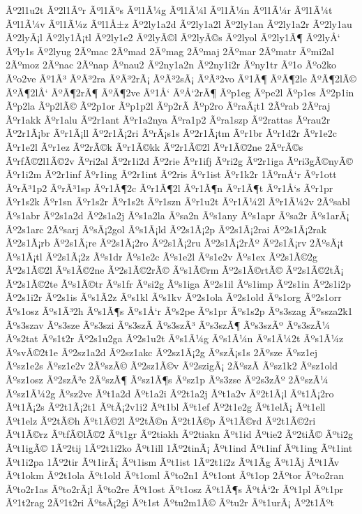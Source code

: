 {Ãº2l1u2t
Ãº2l1Ãºr
Ãºl1Ãºs
Ãºl1Ã¼g
Ãºl1Ã¼l
Ãºl1Ã¼n
Ãºl1Ã¼r
Ãºl1Ã¼t
Ãºl1Ã¼v
Ãºl1Ã¼z
Ãºl1Å±z
Ãº2ly1a2d
Ãº2ly1a2l
Ãº2ly1an
Ãº2ly1a2r
Ãº2ly1au
Ãº2lyÃ¡l
Ãº2ly1Ã¡tl
Ãº2ly1e2
Ãº2lyÃ©l
Ãº2lyÃ©s
Ãº2lyol
Ãº2ly1Ã¶
Ãº2lyÅ‘
Ãºly1s
Ãº2lyug
2Ãºmac
2Ãºmad
2Ãºmag
2Ãºmaj
2Ãºmar
2Ãºmatr
Ãºmi2al
2Ãºmoz
2Ãºnac
2Ãºnap
Ãºnau2
Ãº2ny1a2n
Ãº2ny1i2r
Ãºny1tr
Ãº1o
Ãºo2ko
Ãºo2ve
Ãº1Ã³
ÃºÃ³2ra
ÃºÃ³2rÃ¡
ÃºÃ³2sÃ¡
ÃºÃ³2vo
Ãº1Ã¶
ÃºÃ¶2le
ÃºÃ¶2lÃ©
ÃºÃ¶2lÅ‘
ÃºÃ¶2rÃ¶
ÃºÃ¶2ve
Ãº1Å‘
ÃºÅ‘2rÃ¶
Ãºp1eg
Ãºpe2l
Ãºp1es
Ãº2p1in
Ãºp2la
Ãºp2lÃ©
Ãº2p1or
Ãºp1p2l
Ãºp2rÃ­
Ãºp2ro
ÃºraÃ¡t1
2Ãºrab
2Ãºraj
Ãºr1akk
Ãºr1alu
Ãº2r1ant
Ãºr1a2nya
Ãºra1p2
Ãºra1szp
Ãº2rattas
Ãºrau2r
Ãº2r1Ã¡br
Ãºr1Ã¡ll
Ãº2r1Ã¡2ri
ÃºrÃ¡s1s
Ãº2r1Ã¡tm
Ãºr1br
Ãºr1d2r
Ãºr1e2c
Ãºr1e2l
Ãºr1ez
Ãº2rÃ©k
Ãºr1Ã©kk
Ãº2r1Ã©2l
Ãºr1Ã©2ne
2ÃºrÃ©s
ÃºrfÃ©2l1Ã©2v
Ãºri2al
Ãº2r1i2d
Ãº2rie
Ãºr1ifj
Ãºri2g
Ãº2r1iga
Ãºri3gÃ©nyÃ©
Ãºr1i2m
Ãº2r1inf
Ãºr1ing
Ãº2r1int
Ãº2ris
Ãºr1ist
Ãºr1k2r
1ÃºrnÅ‘r
Ãºr1ott
ÃºrÃ³1p2
ÃºrÃ³1sp
Ãºr1Ã¶2c
Ãºr1Ã¶2l
Ãºr1Ã¶n
Ãºr1Ã¶t
Ãºr1Å‘s
Ãºr1pr
Ãºr1s2k
Ãºr1sn
Ãºr1s2r
Ãºr1s2t
Ãºr1szn
Ãºr1u2t
Ãºr1Ã¼2l
Ãºr1Ã¼2v
2Ãºsabl
Ãºs1abr
Ãº2s1a2d
Ãº2s1a2j
Ãºs1a2la
Ãºsa2n
Ãºs1any
Ãºs1apr
Ãºsa2r
Ãºs1arÃ¡
Ãº2s1arc
2Ãºsarj
ÃºsÃ¡2gol
Ãºs1Ã¡ld
Ãº2s1Ã¡2p
Ãº2s1Ã¡2rai
Ãº2s1Ã¡2rak
Ãº2s1Ã¡rb
Ãº2s1Ã¡re
Ãº2s1Ã¡2ro
Ãº2s1Ã¡2ru
Ãº2s1Ã¡2rÃº
Ãº2s1Ã¡rv
2ÃºsÃ¡t
Ãºs1Ã¡tl
Ãº2s1Ã¡2z
Ãºs1dr
Ãºs1e2c
Ãºs1e2l
Ãºs1e2v
Ãºs1ex
Ãº2s1Ã©2g
Ãº2s1Ã©2l
Ãºs1Ã©2ne
Ãº2s1Ã©2rÃ©
Ãºs1Ã©rm
Ãº2s1Ã©rtÃ©
Ãº2s1Ã©2tÃ¡
Ãº2s1Ã©2te
Ãºs1Ã©tr
Ãºs1fr
Ãºsi2g
Ãºs1iga
Ãº2s1il
Ãºs1imp
Ãº2s1in
Ãº2s1i2p
Ãº2s1i2r
Ãº2s1is
Ãºs1Ã­2z
Ãºs1kl
Ãºs1kv
Ãº2s1ola
Ãº2s1old
Ãºs1org
Ãº2s1orr
Ãºs1osz
Ãºs1Ã³2h
Ãºs1Ã¶s
Ãºs1Å‘r
Ãºs2pe
Ãºs1pr
Ãºs1s2p
Ãºs3szag
Ãºssza2k1
Ãºs3szav
Ãºs3sze
Ãºs3szi
Ãºs3szÃ­
Ãºs3szÃ³
Ãºs3szÃ¶
Ãºs3szÃº
Ãºs3szÃ¼
Ãºs2tat
Ãºs1t2r
Ãº2s1u2ga
Ãº2s1u2t
Ãºs1Ã¼g
Ãºs1Ã¼n
Ãºs1Ã¼2t
Ãºs1Ã¼z
ÃºsvÃ©2t1e
Ãº2sz1a2d
Ãº2sz1akc
Ãº2sz1Ã¡2g
ÃºszÃ¡s1s
2Ãºsze
Ãºsz1ej
Ãºsz1e2s
Ãºsz1e2v
2ÃºszÃ©
Ãº2sz1Ã©v
Ãº2szigÃ¡
2ÃºszÃ­
Ãºsz1k2
Ãºsz1old
Ãºsz1osz
Ãº2szÃ³e
2ÃºszÃ¶
Ãºsz1Ã¶s
Ãºsz1p
Ãºs3zse
Ãº2s3zÃº
2ÃºszÃ¼
Ãºsz1Ã¼2g
Ãºsz2ve
Ãºt1a2d
Ãºt1a2i
Ãº2t1a2j
Ãºt1a2v
Ãº2t1Ã¡l
Ãºt1Ã¡2ro
Ãºt1Ã¡2s
Ãº2t1Ã¡2t1
ÃºtÃ¡2v1i2
Ãºt1bl
Ãºt1ef
Ãº2t1e2g
Ãºt1elÃ¡
Ãºt1ell
Ãºt1elz
Ãº2tÃ©h
Ãºt1Ã©2l
Ãº2tÃ©n
Ãº2t1Ã©p
Ãºt1Ã©rd
Ãº2t1Ã©2ri
Ãºt1Ã©rz
ÃºtfÃ©lÃ©2
Ãºt1gr
Ãº2tiakh
Ãº2tiakn
Ãºt1id
Ãºtie2
Ãº2tiÃ©
Ãºti2g
Ãºt1igÃ©
1Ãº2tij
1Ãº2t1i2ko
Ãºt1ill
1Ãº2tinÃ¡
Ãºt1ind
Ãºt1inf
Ãºt1ing
Ãºt1int
Ãºt1i2pa
1Ãº2tir
Ãºt1irÃ¡
Ãºt1ism
Ãºt1ist
1Ãº2t1i2z
Ãºt1Ã­g
Ãºt1Ã­j
Ãºt1Ã­v
Ãºt1okm
Ãº2t1ola
Ãºt1old
Ãºt1oml
Ãºto2n1
Ãºt1ont
Ãºt1op
2Ãºtor
Ãºto2ran
Ãºto2r1as
Ãºto2rÃ¡l
Ãºto2re
Ãºt1ost
Ãºt1osz
Ãºt1Ã¶s
ÃºtÅ‘2r
Ãºt1pl
Ãºt1pr
Ãº1t2rag
2Ãº1t2ri
ÃºtsÃ¡2gi
Ãºt1st
Ãºtu2m1Ã©
Ãºtu2r
Ãºt1urÃ¡
Ãº2t1Ãºt
}
